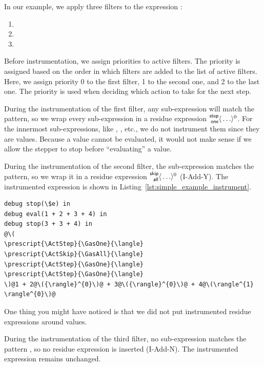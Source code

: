 \begin{enumerate}
  In our example, we apply three filters to the expression
  :
  \begin{enumerate}
  \item {}
  \item {}
  \item {}
  \end{enumerate}

  Before instrumentation, we assign priorities to active filters. The priority
  is assigned based on the order in which filters are added to the list of
  active filters. Here, we assign priority 0 to the first filter, 1 to the
  second one, and 2 to the last one. The priority is used when deciding which
  action to take for the next step.

  During the instrumentation of the first filter, any sub-expression
  will match the pattern, so we wrap every sub-expression in a residue
  expression \(\prescript{\mathsf{step}}{\mathsf{one}}{\langle} \ldots \rangle^{0}\). For the
  innermost sub-expressions, like ,
  , etc., we do not instrument them since
  they are values. Because a value cannot be evaluated, it would not make
  sense if we allow the stepper to stop before ``evaluating'' a
  value.

  During the instrumentation of the second filter, the sub-expression
   matches the pattern, so we
  wrap it in a residue expression
  \(\prescript{\mathsf{skip}}{\mathsf{all}}{\langle} \ldots \rangle^{0}\) (I-Add-Y).  The
  instrumented expression is shown in
  Listing~\ref{lst:simple_example_instrument}.

  \begin{lstlisting}[language=hazel,caption={Program after instrumentation},label={lst:simple_example_instrument}]
debug stop(\$e) in
debug eval(1 + 2 + 3 + 4) in
debug stop(3 + 3 + 4) in
@\(
\prescript{\ActStep}{\GasOne}{\langle}
\prescript{\ActSkip}{\GasAll}{\langle}
\prescript{\ActStep}{\GasOne}{\langle}
\prescript{\ActStep}{\GasOne}{\langle}
\)@1 + 2@\({\rangle}^{0}\)@ + 3@\({\rangle}^{0}\)@ + 4@\(\rangle^{1}
\rangle^{0}\)@\end{lstlisting}

  One thing you might have noticed is that we did not put instrumented
  residue expressions around values.

  During the instrumentation of the third filter, no sub-expression matches the
  pattern , so no residue expression is
  inserted (I-Add-N). The instrumented expression remains unchanged.


\end{enumerate}
